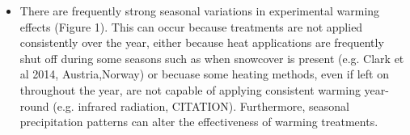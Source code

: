 \documentclass{article}
\begin{document}
\begin{itemize}
\item There are frequently strong seasonal variations in experimental warming effects (Figure 1). This can occur because treatments are not applied consistently over the year, either because heat applications are frequently shut off during some seasons such as when snowcover is present (e.g. Clark et al 2014, Austria,Norway) or becuase some heating methods, even if left on throughout the year, are not capable of applying consistent warming year-round (e.g. infrared radiation, CITATION). Furthermore, seasonal precipitation patterns can alter the effectiveness of warming treatments. %


\end{itemize}
\end{document}
